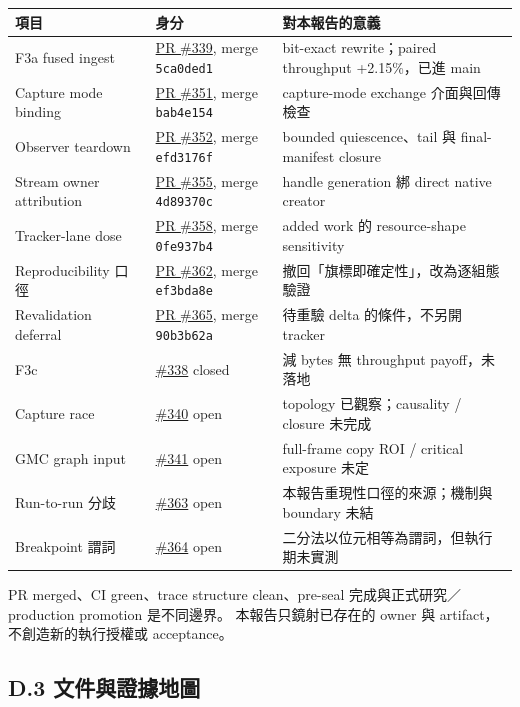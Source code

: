 \documentclass[10pt,a4paper]{ctexart}
\newcommand{\issue}[1]{\href{https://github.com/raylei50653/saccade/issues/#1}{\##1}}
\newcommand{\pr}[1]{\href{https://github.com/raylei50653/saccade/pull/#1}{PR \##1}}
\begin{document}
\begin{tabularx}{\linewidth}{@{}P{25mm}P{35mm}Y@{}}
\toprule
項目 & 身分 & 對本報告的意義\\
\midrule
F3a fused ingest & \pr{339}, merge \texttt{5ca0ded1} & bit-exact rewrite；paired throughput +2.15\%，已進 main\\
Capture mode binding & \pr{351}, merge \texttt{bab4e154} & capture-mode exchange 介面與回傳檢查\\
Observer teardown & \pr{352}, merge \texttt{efd3176f} & bounded quiescence、tail 與 final-manifest closure\\
Stream owner attribution & \pr{355}, merge \texttt{4d89370c} & handle generation 綁 direct native creator\\
Tracker-lane dose & \pr{358}, merge \texttt{0fe937b4} & added work 的 resource-shape sensitivity\\
Reproducibility 口徑 & \pr{362}, merge \texttt{ef3bda8e} & 撤回「旗標即確定性」，改為逐組態驗證\\
Revalidation deferral & \pr{365}, merge \texttt{90b3b62a} & 待重驗 delta 的條件，不另開 tracker\\
F3c & \issue{338} closed & 減 bytes 無 throughput payoff，未落地\\
Capture race & \issue{340} open & topology 已觀察；causality / closure 未完成\\
GMC graph input & \issue{341} open & full-frame copy ROI / critical exposure 未定\\
Run-to-run 分歧 & \issue{363} open & 本報告重現性口徑的來源；機制與 boundary 未結\\
Breakpoint 謂詞 & \issue{364} open & 二分法以位元相等為謂詞，但執行期未實測\\
\bottomrule
\end{tabularx}

\begin{note}
  PR merged、CI green、trace structure clean、pre-seal 完成與正式研究／production promotion 是不同邊界。
  本報告只鏡射已存在的 owner 與 artifact，不創造新的執行授權或 acceptance。
\end{note}

\subsection{D.3 文件與證據地圖}\label{app:D3}
\end{document}
